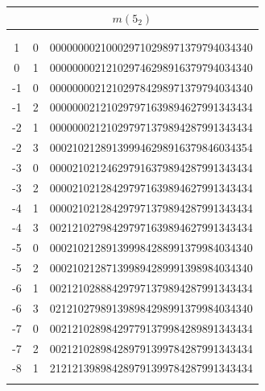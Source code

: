 \documentclass{article}
\begin{document}
\begin{supertabular}[h]{c c r}
\hline
{}                         \\
\hline\\[-3pt] \\[-3pt]
1     & 0  & 000000002100029710298971379794034340  \\
0     & 1  & 000000002121029746298916379794034340  \\
-1    & 0  & 000000002121029784298971379794034340  \\
-1    & 2  & 000000021210297971639894627991343434  \\
-2    & 1  & 000000021210297971379894287991343434  \\
-2    & 3  & 000210212891399946298916379846034354  \\
-3    & 0  & 000021021246297916379894287991343434  \\
-3    & 2  & 000021021284297971639894627991343434  \\
-4    & 1  & 000021021284297971379894287991343434  \\
-4    & 3  & 002121027984297971639894627991343434  \\
-5    & 0  & 000210212891399984288991379984034340  \\
-5    & 2  & 000210212871399894289991398984034340  \\
-6    & 1  & 002121028884297971379894287991343434  \\
-6    & 3  & 021210279891398984298991379984034340  \\
-7    & 0  & 002121028984297791379984289891343434  \\
-7    & 2  & 002121028984289791399784287991343434  \\
-8    & 1  & 212121398984289791399784287991343434  \\
\\[-5pt]


\end{supertabular}
\end{document}
